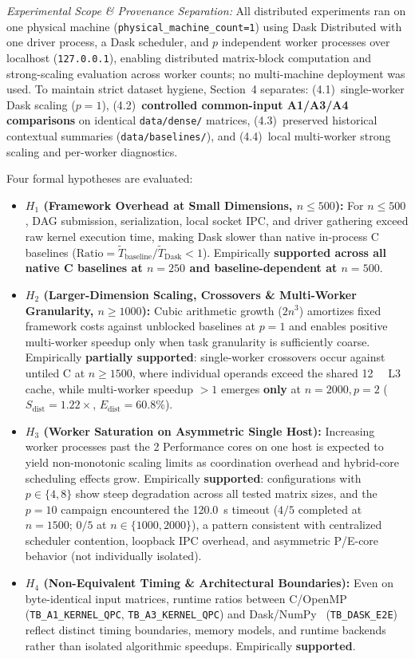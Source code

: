 \documentclass[11pt,a4paper]{article}
\begin{document}
\noindent\textit{Experimental Scope \& Provenance Separation:} All distributed experiments ran on one physical machine (\nolinkurl{physical_machine_count=1}) using Dask Distributed with one driver process, a Dask scheduler, and $p$ independent worker processes over localhost (\texttt{127.0.0.1}), enabling distributed matrix-block computation and strong-scaling evaluation across worker counts; no multi-machine deployment was used. To maintain strict dataset hygiene, Section~4 separates: (4.1)~single-worker Dask scaling ($p=1$), (4.2)~\textbf{controlled common-input A1/A3/A4 comparisons} on identical \nolinkurl{data/dense/} matrices, (4.3)~preserved historical contextual summaries (\nolinkurl{data/baselines/}), and (4.4)~local multi-worker strong scaling and per-worker diagnostics.

Four formal hypotheses are evaluated:
\begin{itemize}
    \item \textbf{$H_1$ (Framework Overhead at Small Dimensions, $n \le 500$):} For $n \le 500$, DAG submission, serialization, local socket IPC, and driver gathering exceed raw kernel execution time, making Dask slower than native in-process C baselines ($\text{Ratio} = \tilde{T}_{\text{baseline}} / \tilde{T}_{\text{Dask}} < 1$). Empirically \textbf{supported across all native C baselines at $n=250$ and baseline-dependent at $n=500$}.
    \item \textbf{$H_2$ (Larger-Dimension Scaling, Crossovers \& Multi-Worker Granularity, $n \ge 1000$):} Cubic arithmetic growth ($2n^3$) amortizes fixed framework costs against unblocked baselines at $p=1$ and enables positive multi-worker speedup only when task granularity is sufficiently coarse. Empirically \textbf{partially supported}: single-worker crossovers occur against untiled C at $n \ge 1500$, where individual operands exceed the shared \SI{12}{\mega\byte} L3 cache, while multi-worker speedup $> 1$ emerges \textbf{only} at $n=2000, p=2$ ($S_{\text{dist}}=1.22\times$, $E_{\text{dist}}=60.8\%$).
    \item \textbf{$H_3$ (Worker Saturation on Asymmetric Single Host):} Increasing worker processes past the 2 Performance cores on one host is expected to yield non-monotonic scaling limits as coordination overhead and hybrid-core scheduling effects grow. Empirically \textbf{supported}: configurations with $p \in \{4, 8\}$ show steep degradation across all tested matrix sizes, and the $p=10$ campaign encountered the \SI{120.0}{\second} timeout ($4/5$ completed at $n=1500$; $0/5$ at $n \in \{1000, 2000\}$), a pattern consistent with centralized scheduler contention, loopback IPC overhead, and asymmetric P/E-core behavior (not individually isolated).
    \item \textbf{$H_4$ (Non-Equivalent Timing \& Architectural Boundaries):} Even on byte-identical input matrices, runtime ratios between C/OpenMP (\texttt{TB\_A1\_KERNEL\_QPC}, \texttt{TB\_A3\_KERNEL\_QPC}) and Dask/NumPy~\cite{VanDerWalt2011} (\texttt{TB\_DASK\_E2E}) reflect distinct timing boundaries, memory models, and runtime backends rather than isolated algorithmic speedups. Empirically \textbf{supported}.
\end{itemize}
\end{document}
